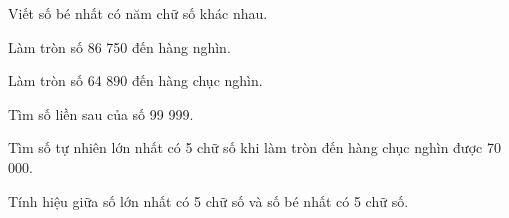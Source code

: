 \begin{ex} %
Viết số bé nhất có năm chữ số khác nhau.
\end{ex}

\begin{ex} %
Làm tròn số 86 750 đến hàng nghìn.
\end{ex}

\begin{ex} %
Làm tròn số 64 890 đến hàng chục nghìn.
\end{ex}

\begin{ex} %
Tìm số liền sau của số 99 999.
\end{ex}

\begin{ex} %
Tìm số tự nhiên lớn nhất có 5 chữ số khi làm tròn đến hàng chục nghìn được 70 000.
\end{ex}

\begin{ex} %
Tính hiệu giữa số lớn nhất có 5 chữ số và số bé nhất có 5 chữ số.
\end{ex}
